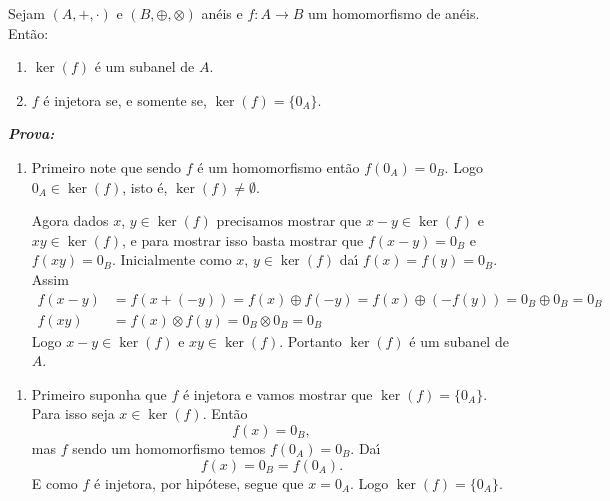 \documentclass{beamer}
\begin{document}
    \begin{frame}
        \begin{proposicao}
            Sejam $(A, +, \cdot)$ e $(B, \oplus, \otimes)$ an\'eis e $f : A \to B$ um homomorfismo de an\'eis. Ent\~ao:
            \begin{enumerate}[label={\roman*})]
                \item $\ker(f)$ \'e um subanel de $A$.

                \vspace{.5cm}

                \item $f$ \'e injetora se, e somente se, $\ker(f) = \{0_A\}$.

                \vspace{.5cm}
            \end{enumerate}
        \end{proposicao}
    \end{frame}

    \begin{frame}
        \noindent \textbf{\textit{Prova: }}
        \begin{enumerate}[label={\roman*})]
            \item Primeiro note que sendo $f$ \'e um homomorfismo ent\~ao $f(0_A) = 0_B$. Logo $0_A \in \ker(f)$, isto \'e, $\ker(f) \ne \emptyset$.

            Agora dados $x$, $y \in \ker(f)$ precisamos mostrar que $x - y \in \ker(f)$ e $xy \in \ker(f)$, e para mostrar isso basta mostrar que $f(x - y) = 0_B$ e$f(xy) = 0_B$. Inicialmente como $x$, $y \in \ker(f)$ da{\'\i} $f(x) = f(y) = 0_B$. Assim
            \begin{align*}
                f(x - y) &= f(x + (-y)) = f(x) \oplus f(-y) = f(x) \oplus (-f(y)) = 0_B \oplus 0_B = 0_B\\
                f(xy) &= f(x)\otimes f(y) = 0_B \otimes 0_B = 0_B
            \end{align*}
            Logo $x - y \in \ker(f)$ e $xy \in \ker(f)$. Portanto $\ker(f)$ \'e um subanel de $A$.

            \seti
        \end{enumerate}
    \end{frame}

    \begin{frame}
        \begin{enumerate}[label={\roman*})]
            \conti
            \item Primeiro suponha que $f$ \'e injetora e vamos mostrar que $\ker(f) = \{0_A\}$. Para isso seja $x \in \ker(f)$. Ent\~ao
            \[
                f(x) = 0_B,
            \]
            mas $f$ sendo um homomorfismo temos $f(0_A) = 0_B$. Da{\'\i}
            \[
                f(x) = 0_B = f(0_A).
            \]
            E como $f$ \'e injetora, por hip\'otese, segue que $x = 0_A$. Logo $\ker(f) = \{0_A\}$.
        \end{enumerate}
    \end{frame}
\end{document}
